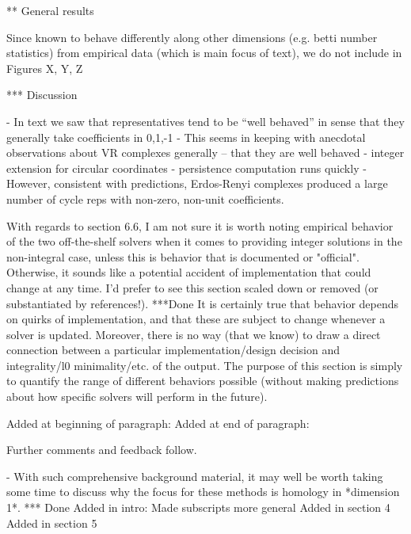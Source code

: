\documentclass{article}
\begin{document}
    ** General results
    
    Since known to behave differently along other dimensions (e.g. betti number statistics) from empirical data (which is main focus of text), we do not include in Figures X, Y, Z
    
    *** Discussion
    
    - In text we saw that representatives tend to be ``well behaved'' in sense that they generally take coefficients in 0,1,-1
    - This seems in keeping with anecdotal observations about VR complexes generally -- that they are well behaved
        - integer extension for circular coordinates
        - persistence computation runs quickly
    - However, consistent with predictions, Erdos-Renyi complexes produced a large number of cycle reps with non-zero, non-unit coefficients.

With regards to section 6.6, I am not sure it is worth noting empirical behavior of the two off-the-shelf solvers when it comes to providing integer solutions in the non-integral case, unless this is behavior that is documented or "official". Otherwise, it sounds like a potential accident of implementation that could change at any time. I'd prefer to see this section scaled down or removed (or substantiated by references!).
***Done
It is certainly true that behavior depends on quirks of implementation, and that these are subject to change whenever a solver is updated.  Moreover, there is no way (that we know) to draw a direct connection between a particular implementation/design decision and integrality/l0 minimality/etc. of the output.  The purpose of this section is simply to quantify the range of different behaviors possible (without making predictions about how specific solvers will perform in the future).



Added at beginning of paragraph:  
Added at end of paragraph: 

Further comments and feedback follow.

- With such comprehensive background material, it may well be worth taking some time to discuss why the focus for these methods is homology in *dimension 1*.
*** Done
Added in intro: 
Made subscripts more general
Added in section 4 
Added in section 5
\end{document}
